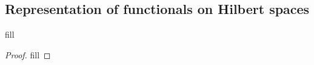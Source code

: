 \subsection{Representation of functionals on Hilbert spaces}

\begin{exercise}{1}
fill
\end{exercise}
\begin{proof}
fill
\end{proof}